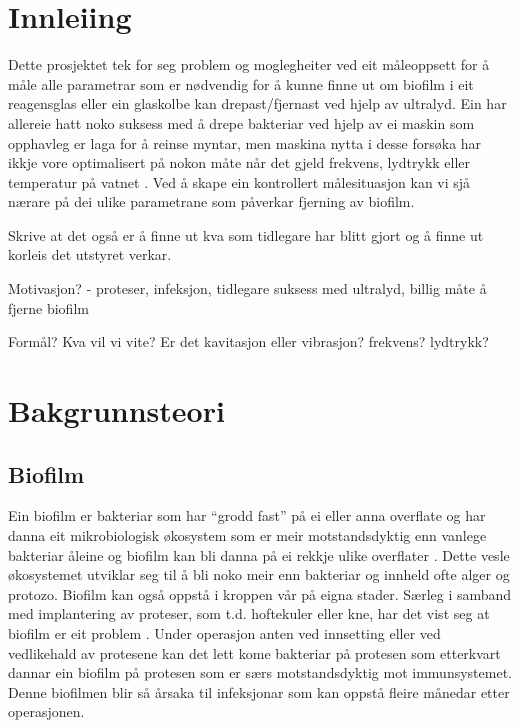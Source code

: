 \documentclass[12pt,norsk]{article}
\begin{document}
\newpage
\tableofcontents
\thispagestyle{empty}
\listoftables
\listoffigures

\newpage
\setcounter{page}{1} 
\section{Innleiing}
Dette prosjektet tek for seg problem og moglegheiter ved eit måleoppsett for å måle alle parametrar som er nødvendig for å kunne finne ut om biofilm i eit reagensglas eller ein glaskolbe kan drepast/fjernast ved hjelp av ultralyd. Ein har allereie hatt noko suksess med å drepe bakteriar ved hjelp av ei maskin som opphavleg er laga for å reinse myntar, men maskina nytta i desse forsøka har ikkje vore optimalisert på nokon måte når det gjeld frekvens, lydtrykk eller temperatur på vatnet \cite{ultraprotese}. Ved å skape ein kontrollert målesituasjon kan vi sjå nærare på dei ulike parametrane som påverkar fjerning av biofilm.

Skrive at det også er å finne ut kva som tidlegare har blitt gjort og å finne ut korleis det utstyret verkar.

Motivasjon? - proteser, infeksjon, tidlegare suksess med ultralyd, billig måte å fjerne biofilm

Formål? Kva vil vi vite? Er det kavitasjon eller vibrasjon? frekvens? lydtrykk?

\clearpage
\section{Bakgrunnsteori}
\subsection{Biofilm}
Ein biofilm er bakteriar som har ``grodd fast'' på ei eller anna overflate og har danna eit mikrobiologisk økosystem som er meir motstandsdyktig enn vanlege bakteriar åleine og biofilm kan bli danna på ei rekkje ulike overflater \cite{biofilm}\cite{biofilm2}. Dette vesle økosystemet utviklar seg til å bli noko meir enn bakteriar og innheld ofte alger og protozo. Biofilm kan også oppstå i kroppen vår på eigna stader. Særleg i samband med implantering av proteser, som t.d. hoftekuler eller kne, har det vist seg at biofilm er eit problem \cite{ultraprotese}. Under operasjon anten ved innsetting eller ved vedlikehald av protesene kan det lett kome bakteriar på protesen som etterkvart dannar ein biofilm på protesen som er særs motstandsdyktig mot immunsystemet. Denne biofilmen blir så årsaka til infeksjonar som kan oppstå fleire månedar etter operasjonen. 
\end{document}
